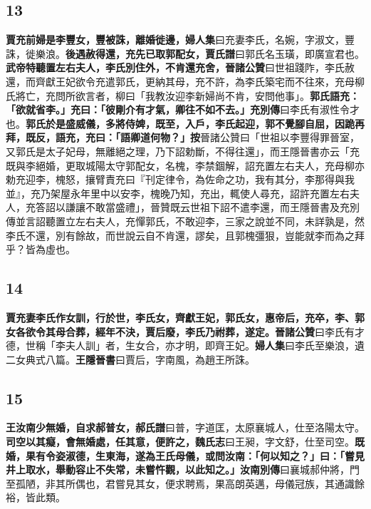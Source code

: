 \subsection*{13}

\textbf{賈充前婦是李豐女，豐被誅，離婚徙邊，}{\footnotesize \textbf{婦人集}曰充妻李氏，名婉，字淑文，豐誅，徙樂浪。}\textbf{後遇赦得還，充先已取郭配女，}{\footnotesize \textbf{賈氏譜}曰郭氏名玉璜，即廣宣君也。}\textbf{武帝特聽置左右夫人，李氏別住外，不肯還充舍，}{\footnotesize \textbf{晉諸公贊}曰世祖踐阼，李氏赦還，而齊獻王妃欲令充遣郭氏，更納其母，充不許，為李氏築宅而不往來，充母柳氏將亡，充問所欲言者，柳曰「我教汝迎李新婦尚不肯，安問他事」。}\textbf{郭氏語充：「欲就省李。」充曰：「彼剛介有才氣，卿往不如不去。」}{\footnotesize \textbf{充別傳}曰李氏有淑性令才也。}\textbf{郭氏於是盛威儀，多將侍婢，既至，入戶，李氏起迎，郭不覺腳自屈，因跪再拜，既反，語充，充曰：「語卿道何物？」}{\footnotesize \textbf{按}晉諸公贊曰「世祖以李豐得罪晉室，又郭氏是太子妃母，無離絕之理，乃下詔勅斷，不得往還」，而王隱晉書亦云「充既與李絕婚，更取城陽太守郭配女，名槐，李禁錮解，詔充置左右夫人，充母柳亦勅充迎李，槐怒，攘臂責充曰『刊定律令，為佐命之功，我有其分，李那得與我並』，充乃架屋永年里中以安李，槐晚乃知，充出，輒使人尋充，詔許充置左右夫人，充答詔以謙讓不敢當盛禮」，晉贊既云世祖下詔不遣李還，而王隱晉書及充別傳並言詔聽置立左右夫人，充憚郭氏，不敢迎李，三家之說並不同，未詳孰是，然李氏不還，別有餘故，而世說云自不肯還，謬矣，且郭槐彊狠，豈能就李而為之拜乎？皆為虛也。}

\subsection*{14}

\textbf{賈充妻李氏作女訓，行於世，李氏女，齊獻王妃，郭氏女，惠帝后，充卒，李、郭女各欲令其母合葬，經年不決，賈后廢，李氏乃祔葬，遂定。}{\footnotesize \textbf{晉諸公贊}曰李氏有才德，世稱「李夫人訓」者，生女合，亦才明，即齊王妃。\textbf{婦人集}曰李氏至樂浪，遺二女典式八篇。\textbf{王隱晉書}曰賈后，字南風，為趙王所誅。}

\subsection*{15}

\textbf{王汝南少無婚，自求郝普女，}{\footnotesize \textbf{郝氏譜}曰普，字道匡，太原襄城人，仕至洛陽太守。}\textbf{司空以其癡，會無婚處，任其意，便許之，}{\footnotesize \textbf{魏氏志}曰王昶，字文舒，仕至司空。}\textbf{既婚，果有令姿淑德，生東海，遂為王氏母儀，或問汝南：「何以知之？」曰：「嘗見井上取水，舉動容止不失常，未嘗忤觀，以此知之。」}{\footnotesize \textbf{汝南別傳}曰襄城郝仲將，門至孤陋，非其所偶也，君嘗見其女，便求聘焉，果高朗英邁，母儀冠族，其通識餘裕，皆此類。}

